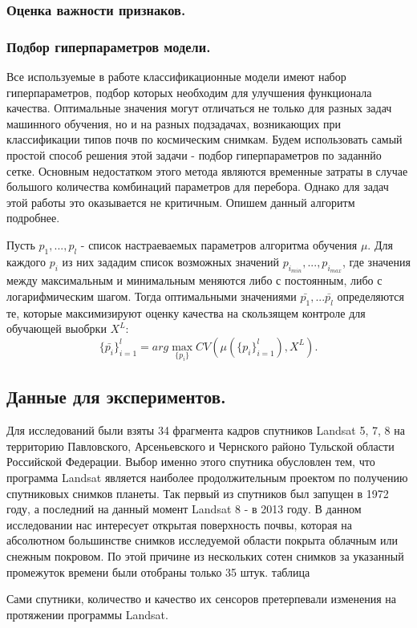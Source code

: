 \documentclass[12pt]{article}
\begin{document}
\subsubsection{Оценка важности признаков.}


\subsubsection{Подбор гиперпараметров модели.}

\par
Все используемые в работе классификационные модели имеют набор гиперпараметров, подбор которых
необходим для улучшения функционала качества. Оптимальные значения могут отличаться не только
для разных задач машинного обучения, но и на разных подзадачах, возникающих при классификации
типов почв по космическим снимкам. Будем использовать самый простой способ решения этой задачи - 
подбор гиперпараметров по заданнйо сетке. Основным недостатком этого метода являются
временные затраты в случае большого количества комбинаций параметров для перебора.
Однако для задач этой работы это оказывается не критичным. Опишем данный алгоритм подробнее.
\par
Пусть $p_1, ..., p_l$ - список настраеваемых параметров алгоритма обучения $\mu$.
Для каждого $p_i$ из них зададим список возможных значений $p_{i_{min}}, ..., p_{i_{max}}$,
где значения между максимальным и минимальным меняются либо с постоянным,
либо с логарифмическим шагом. Тогда оптимальными значениями $\bar{p_1}, ... \bar{p_l}$
определяются те, которые максимизируют оценку качества на скользящем контроле для
обучающей выобрки $X^L$:
\[
    \{\bar{p_i}\}_{i=1}^l=arg\max_{\{p_i\}} CV(\mu(\{p_i\}_{i=1}^l), X^L).
\]

\subsection{Данные для экспериментов.}

\par
Для исследований были взяты 34 фрагмента кадров спутников Landsat 5, 7, 8 
на территорию Павловского, Арсеньевского и Чернского районо Тульской области Российской Федерации.
Выбор именно этого спутника обусловлен тем, что программа Landsat является наиболее
продолжительным проектом по получению спутниковых снимков планеты. Так первый из спутников
был запущен в 1972 году, а последний на данный момент Landsat 8 - в 2013 году.
В данном исследовании нас интересует открытая поверхность почвы, которая на абсолютном
большинстве снимков исследуемой области покрыта облачным или снежным покровом.
По этой причине из нескольких сотен снимков за указанный промежуток времени были
отобраны только 35 штук. {\color{red} таблица}
\par
Сами спутники, количество и качество их сенсоров претерпевали изменения на протяжении
программы Landsat. 
\end{document}
